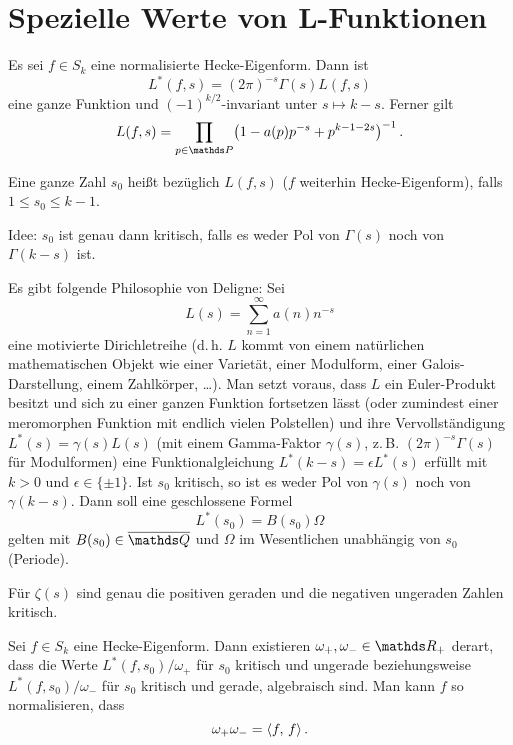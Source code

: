 \section{Spezielle Werte von L-Funktionen}

\begin{erin}
	Es sei $f \in S_k$ eine normalisierte Hecke-Eigenform. Dann ist
	\[
		L^*(f, s) = (2\pi)^{-s} \Gamma(s) L(f, s)
	\]
	eine ganze Funktion und $(-1)^{k/2}$-invariant unter $s \mapsto k - s$. Ferner gilt 
	\[
		L(f,s) = \prod_{p \in \PP} \bigl(1 - a(p)p^{-s} + p^{k-1-2s}\bigr)^{-1}
		\,.
	\]
\end{erin}

\begin{defi}
	Eine ganze Zahl $s_0$ heißt  bezüglich $L(f,s)$ ($f$ weiterhin Hecke-Eigenform), falls $1 \leq s_0 \leq k-1$. 
	
	Idee: $s_0$ ist genau dann kritisch, falls es weder Pol von $\Gamma(s)$ noch von $\Gamma(k-s)$ ist.
\end{defi}

Es gibt folgende Philosophie von Deligne: Sei 
\[
	L(s) = \sum_{n=1}^\infty a(n)n^{-s}
\]
eine \glqq{}motivierte\grqq{} Dirichletreihe (d.\,h. $L$ kommt von einem natürlichen mathematischen Objekt wie einer Varietät, einer Modulform, einer Galois-Darstellung, einem Zahlkörper, \ldots). Man setzt voraus, dass $L$ ein Euler-Produkt besitzt und sich zu einer ganzen Funktion fortsetzen lässt (oder zumindest einer meromorphen Funktion mit endlich vielen Polstellen) und ihre Vervollständigung $L^*(s) = \gamma(s)L(s)$ (mit einem Gamma-Faktor $\gamma(s)$, z.\,B. $(2\pi)^{-s} \Gamma(s)$ für Modulformen) eine Funktionalgleichung $L^*(k - s) = \epsilon L^*(s)$ erfüllt mit $k > 0$ und $\epsilon \in \{\pm1\}$. Ist $s_0$ kritisch, so ist es weder Pol von $\gamma(s)$ noch von $\gamma(k-s)$. Dann soll eine geschlossene Formel
\[
	L^*(s_0) = B(s_0) \Omega
\]
gelten mit $B(s_0) \in \closure{\QQ}$ und $\Omega$ \glqq{}im Wesentlichen unabhängig von $s_0$\grqq{} (\glqq Periode\grqq).

\begin{bsp}
	Für $\zeta(s)$ sind genau die positiven geraden und die negativen ungeraden Zahlen kritisch.
\end{bsp}

\begin{satz}
	Sei $f \in S_k$ eine Hecke-Eigenform.
	Dann existieren $\omega_+, \omega_- \in \RR_+$ derart, dass die Werte $L^*(f, s_0)/\omega_+$ für $s_0$ kritisch und ungerade beziehungsweise $L^*(f, s_0)/\omega_-$ für $s_0$ kritisch und gerade, algebraisch sind. Man kann $f$ so normalisieren, dass
	\[
		\omega_+ \omega_- = \scalarprd ff
		\,.
	\]
\end{satz}

